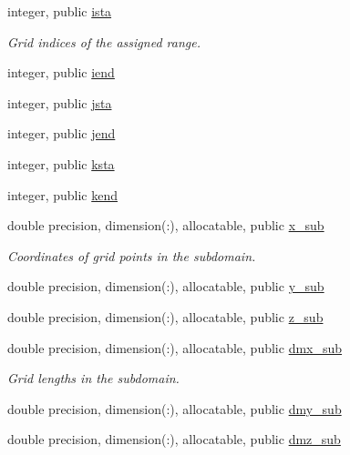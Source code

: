 \textbf{ }\par
\begin{DoxyCompactItemize}
\item 
integer, public \hyperlink{namespacempi__subdomain_ab8925faaa6f45326c1d11efa37e03566}{ista}
\begin{DoxyCompactList}\small\item\em Grid indices of the assigned range. \end{DoxyCompactList}\item 
integer, public \hyperlink{namespacempi__subdomain_abbd7d35107c53bcfd2b2b52771f4aa67}{iend}
\item 
integer, public \hyperlink{namespacempi__subdomain_ac85bfba1caf77f9c3c0047fe9450fee6}{jsta}
\item 
integer, public \hyperlink{namespacempi__subdomain_a06433a0d1a081c51202a0010c21c9d36}{jend}
\item 
integer, public \hyperlink{namespacempi__subdomain_acd499eb1d07159aa9f5c878f9519b00f}{ksta}
\item 
integer, public \hyperlink{namespacempi__subdomain_af9934313b1ccbcb09f30916df3326076}{kend}
\end{DoxyCompactItemize}

\textbf{ }\par
\begin{DoxyCompactItemize}
\item 
double precision, dimension(\+:), allocatable, public \hyperlink{namespacempi__subdomain_a978554e1520c79471ef3793ed1872b37}{x\+\_\+sub}
\begin{DoxyCompactList}\small\item\em Coordinates of grid points in the subdomain. \end{DoxyCompactList}\item 
double precision, dimension(\+:), allocatable, public \hyperlink{namespacempi__subdomain_a58b09abee5f1002de7b20b1b86f5c821}{y\+\_\+sub}
\item 
double precision, dimension(\+:), allocatable, public \hyperlink{namespacempi__subdomain_aab6d78e49471a9a3db5ad9df4c3d4041}{z\+\_\+sub}
\end{DoxyCompactItemize}

\textbf{ }\par
\begin{DoxyCompactItemize}
\item 
double precision, dimension(\+:), allocatable, public \hyperlink{namespacempi__subdomain_a56af1740899dc9df6868e5e71a0884a5}{dmx\+\_\+sub}
\begin{DoxyCompactList}\small\item\em Grid lengths in the subdomain. \end{DoxyCompactList}\item 
double precision, dimension(\+:), allocatable, public \hyperlink{namespacempi__subdomain_ae44efbff9669bfad03a79ab41b5e8ace}{dmy\+\_\+sub}
\item 
double precision, dimension(\+:), allocatable, public \hyperlink{namespacempi__subdomain_afb6341d7362587d6fd0a06fe78ba4e3f}{dmz\+\_\+sub}
\end{DoxyCompactItemize}

